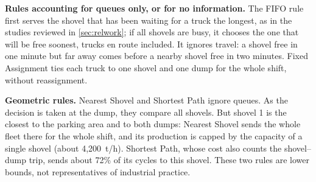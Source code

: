 \documentclass[11pt,a4paper]{article}
\newif\ifrevmarks
\newcommand{\revtag}[1]{\ifrevmarks\textsuperscript{\textcolor{red!70!black}{\scriptsize[#1]}}\fi}
\newenvironment{revbloc}[1]{\par\ifrevmarks\color{revcolor}\noindent\revtag{#1}\ \fi}{\par}
\begin{document}
\begin{revbloc}{M25, M16, Dir. corr. 1, A, v3}
\textbf{Rules accounting for queues only, or for no information.} The FIFO rule first serves the shovel that has been waiting for a truck the longest, as in the studies reviewed in \cref{sec:relwork}; if all shovels are busy, it chooses the one that will be free soonest, trucks en route included. It ignores travel: a shovel free in one minute but far away comes before a nearby shovel free in two minutes. Fixed Assignment ties each truck to one shovel and one dump for the whole shift, without reassignment.

\textbf{Geometric rules.} Nearest Shovel and Shortest Path ignore queues. As the decision is taken at the dump, they compare all shovels. But shovel 1 is the closest to the parking area and to both dumps: Nearest Shovel sends the whole fleet there for the whole shift, and its production is capped by the capacity of a single shovel (about 4{,}200~t/h). Shortest Path, whose cost also counts the shovel--dump trip, sends about 72\% of its cycles to this shovel. These two rules are lower bounds, not representatives of industrial practice.
\end{revbloc}
\end{document}

